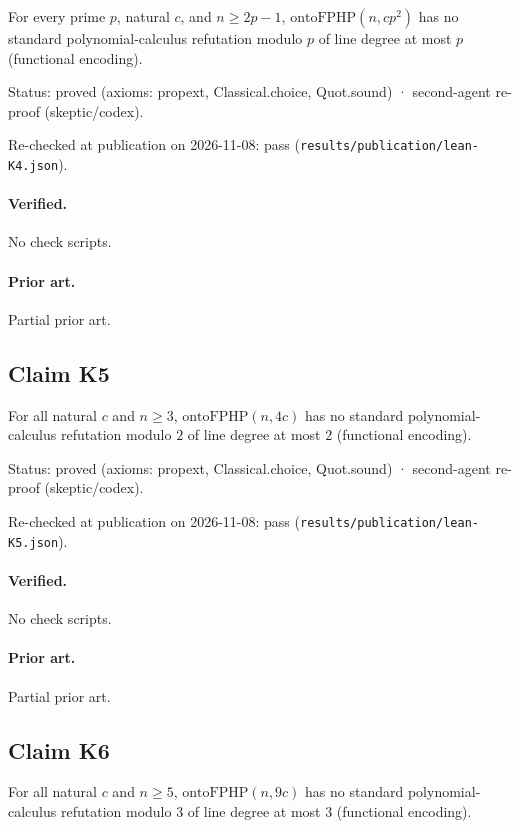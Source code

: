 \documentclass{article}
\begin{document}
For every prime $p$, natural $c$, and $n\ge2p-1$, $\mathrm{ontoFPHP}(n,cp^2)$ has no standard polynomial-calculus refutation modulo $p$ of line degree at most $p$ (functional encoding).

Status: proved (axioms: propext, Classical.choice, Quot.sound) · second-agent re-proof (skeptic/codex).

Re-checked at publication on 2026-11-08: pass (\texttt{results/publication/lean-K4.json}).

\paragraph{Verified.}
No check scripts.

\paragraph{Prior art.} Partial prior art.

\subsection*{Claim K5}

For all natural $c$ and $n\ge3$, $\mathrm{ontoFPHP}(n,4c)$ has no standard polynomial-calculus refutation modulo $2$ of line degree at most $2$ (functional encoding).

Status: proved (axioms: propext, Classical.choice, Quot.sound) · second-agent re-proof (skeptic/codex).

Re-checked at publication on 2026-11-08: pass (\texttt{results/publication/lean-K5.json}).

\paragraph{Verified.}
No check scripts.

\paragraph{Prior art.} Partial prior art.

\subsection*{Claim K6}

For all natural $c$ and $n\ge5$, $\mathrm{ontoFPHP}(n,9c)$ has no standard polynomial-calculus refutation modulo $3$ of line degree at most $3$ (functional encoding).
\end{document}
